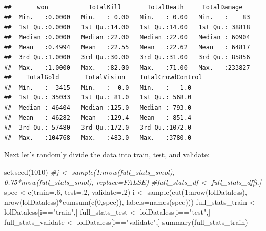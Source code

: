 \documentclass[
]{article}
\newenvironment{Shaded}{\begin{snugshade}}{\end{snugshade}}
\newcommand{\AttributeTok}[1]{\textcolor[rgb]{0.77,0.63,0.00}{#1}}
\newcommand{\CommentTok}[1]{\textcolor[rgb]{0.56,0.35,0.01}{\textit{#1}}}
\newcommand{\DecValTok}[1]{\textcolor[rgb]{0.00,0.00,0.81}{#1}}
\newcommand{\FunctionTok}[1]{\textcolor[rgb]{0.00,0.00,0.00}{#1}}
\newcommand{\NormalTok}[1]{#1}
\newcommand{\OtherTok}[1]{\textcolor[rgb]{0.56,0.35,0.01}{#1}}
\newcommand{\SpecialCharTok}[1]{\textcolor[rgb]{0.00,0.00,0.00}{#1}}
\newcommand{\StringTok}[1]{\textcolor[rgb]{0.31,0.60,0.02}{#1}}
\begin{document}
\begin{verbatim}
##       won           TotalKill       TotalDeath     TotalDamage    
##  Min.   :0.0000   Min.   : 0.00   Min.   : 0.00   Min.   :    83  
##  1st Qu.:0.0000   1st Qu.:14.00   1st Qu.:14.00   1st Qu.: 38818  
##  Median :0.0000   Median :22.00   Median :22.00   Median : 60904  
##  Mean   :0.4994   Mean   :22.55   Mean   :22.62   Mean   : 64817  
##  3rd Qu.:1.0000   3rd Qu.:30.00   3rd Qu.:31.00   3rd Qu.: 85856  
##  Max.   :1.0000   Max.   :82.00   Max.   :71.00   Max.   :233827  
##    TotalGold       TotalVision    TotalCrowdControl
##  Min.   :  3415   Min.   :  0.0   Min.   :   1.0   
##  1st Qu.: 35033   1st Qu.: 81.0   1st Qu.: 568.0   
##  Median : 46404   Median :125.0   Median : 793.0   
##  Mean   : 46282   Mean   :129.4   Mean   : 851.4   
##  3rd Qu.: 57480   3rd Qu.:172.0   3rd Qu.:1072.0   
##  Max.   :104768   Max.   :483.0   Max.   :3780.0
\end{verbatim}

Next let's randomly divide the data into train, test, and validate:

\begin{Shaded}
\begin{Highlighting}[]
\FunctionTok{set.seed}\NormalTok{(}\DecValTok{1010}\NormalTok{)}
\CommentTok{\#j \textless{}{-} sample(1:nrow(full\_stats\_smol), 0.75*nrow(full\_stats\_smol), replace=FALSE)}
\CommentTok{\#full\_stats\_df \textless{}{-} full\_stats\_df[j,]}
\NormalTok{spec }\OtherTok{\textless{}{-}}\FunctionTok{c}\NormalTok{(}\AttributeTok{train=}\NormalTok{.}\DecValTok{6}\NormalTok{, }\AttributeTok{test=}\NormalTok{.}\DecValTok{2}\NormalTok{, }\AttributeTok{validate=}\NormalTok{.}\DecValTok{2}\NormalTok{)}
\NormalTok{i }\OtherTok{\textless{}{-}} \FunctionTok{sample}\NormalTok{(}\FunctionTok{cut}\NormalTok{(}\DecValTok{1}\SpecialCharTok{:}\FunctionTok{nrow}\NormalTok{(lolDataless), }\FunctionTok{nrow}\NormalTok{(lolDataless)}\SpecialCharTok{*}\FunctionTok{cumsum}\NormalTok{(}\FunctionTok{c}\NormalTok{(}\DecValTok{0}\NormalTok{,spec)), }\AttributeTok{labels=}\FunctionTok{names}\NormalTok{(spec)))}
\NormalTok{full\_stats\_train }\OtherTok{\textless{}{-}}\NormalTok{ lolDataless[i}\SpecialCharTok{==}\StringTok{"train"}\NormalTok{,]}
\NormalTok{full\_stats\_test }\OtherTok{\textless{}{-}}\NormalTok{ lolDataless[i}\SpecialCharTok{==}\StringTok{"test"}\NormalTok{,]}
\NormalTok{full\_stats\_validate }\OtherTok{\textless{}{-}}\NormalTok{ lolDataless[i}\SpecialCharTok{==}\StringTok{"validate"}\NormalTok{,]}
\FunctionTok{summary}\NormalTok{(full\_stats\_train)}
\end{Highlighting}
\end{Shaded}
\end{document}
